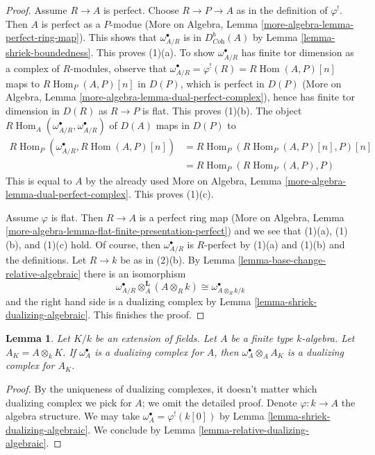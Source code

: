 \documentclass{stacks-project}
\theoremstyle{plain}
\newtheorem{lemma}[subsection]{Lemma}
\theoremstyle{definition}
\theoremstyle{remark}
\numberwithin{equation}{subsection}
\def\Hom{\mathop{\mathrm{Hom}}\nolimits}
\begin{document}
\begin{proof}
Assume $R \to A$ is perfect. Choose $R \to P \to A$ as in the definition
of $\varphi^!$. Then $A$ is perfect as a $P$-modue
(More on Algebra, Lemma \ref{more-algebra-lemma-perfect-ring-map}).
This shows that $\omega_{A/R}^\bullet$ is in $D^b_{\textit{Coh}}(A)$
by Lemma \ref{lemma-shriek-boundedness}. This proves (1)(a).
To show $\omega_{A/R}^\bullet$ has finite tor dimension
as a complex of $R$-modules, observe that
$\omega_{A/R}^\bullet = \varphi^!(R) = R\Hom(A, P)[n]$
maps to $R\Hom_P(A, P)[n]$ in $D(P)$, which is perfect in $D(P)$
(More on Algebra, Lemma \ref{more-algebra-lemma-dual-perfect-complex}),
hence has finite tor dimension in $D(R)$
as $R \to P$ is flat. This proves (1)(b). The object
$R\Hom_A(\omega_{A/R}^\bullet, \omega_{A/R}^\bullet)$
of $D(A)$ maps in $D(P)$ to
\begin{align*}
R\Hom_P(\omega_{A/R}^\bullet, R\Hom(A, P)[n])
& =
R\Hom_P(R\Hom_P(A, P)[n], P)[n] \\
& =
R\Hom_P(R\Hom_P(A, P), P)
\end{align*}
This is equal to $A$ by the already used
More on Algebra, Lemma \ref{more-algebra-lemma-dual-perfect-complex}.
This proves (1)(c).

\medskip\noindent
Assume $\varphi$ is flat. Then $R \to A$ is a perfect ring map
(More on Algebra, Lemma
\ref{more-algebra-lemma-flat-finite-presentation-perfect})
and we see that (1)(a), (1)(b), and (1)(c) hold.
Of course, then $\omega_{A/R}^\bullet$ is $R$-perfect by
(1)(a) and (1)(b) and the definitions.
Let $R \to k$ be as in (2)(b).
By Lemma \ref{lemma-base-change-relative-algebraic}
there is an isomorphism
$$
\omega_{A/R}^\bullet \otimes_A^\mathbf{L} (A \otimes_R k) \cong
\omega^\bullet_{A \otimes_R k/k}
$$
and the right hand side is a dualizing complex by
Lemma \ref{lemma-shriek-dualizing-algebraic}. This finishes the proof.
\end{proof}

\begin{lemma}
\label{lemma-base-change-dualizing-over-field}
Let $K/k$ be an extension of fields. Let $A$ be a finite type
$k$-algebra. Let $A_K = A \otimes_k K$. If
$\omega_A^\bullet$ is a dualizing complex for $A$, then
$\omega_A^\bullet \otimes_A A_K$ is a dualizing complex for $A_K$.
\end{lemma}

\begin{proof}
By the uniqueness of dualizing complexes, it doesn't matter which
dualizing complex we pick for $A$; we omit the detailed proof.
Denote $\varphi : k \to A$ the algebra structure.
We may take $\omega_A^\bullet = \varphi^!(k[0])$ by
Lemma \ref{lemma-shriek-dualizing-algebraic}.
We conclude by
Lemma \ref{lemma-relative-dualizing-algebraic}.
\end{proof}
\end{document}
